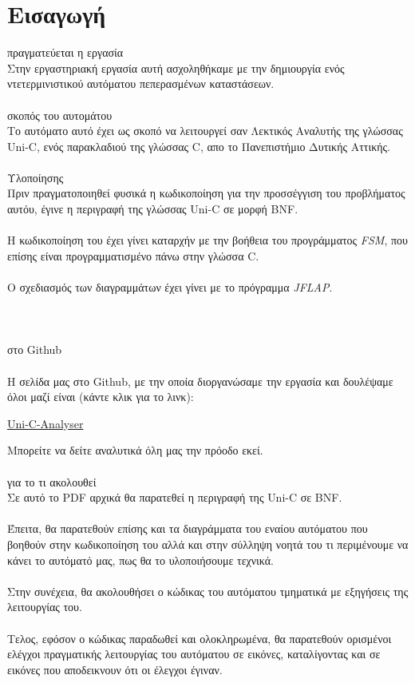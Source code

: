 \documentclass[14pt]{extarticle}
\begin{document}
\section{Εισαγωγή}
\large{ πραγματεύεται η εργασία}
\\
Στην εργαστηριακή εργασία αυτή ασχοληθήκαμε με την δημιουργία ενός ντετερμινιστικού αυτόματου πεπερασμένων καταστάσεων.
\\
\\
\large{ σκοπός του αυτομάτου}
\\
Το αυτόματο αυτό έχει ως σκοπό να λειτουργεί σαν Λεκτικός Αναλυτής της γλώσσας \textlatin{Uni-C}, ενός παρακλαδιού της γλώσσας \textlatin{C}, απο το Πανεπιστήμιο Δυτικής Αττικής.  
\\
\\
\large{ Υλοποίησης}
\\
Πριν πραγματοποιηθεί φυσικά η κωδικοποίηση για την προσσέγγιση του προβλήματος αυτόυ, έγινε η περιγραφή της γλώσσας \textlatin{Uni-C} σε μορφή \textlatin{BNF}. 
\\
\\
Η κωδικοποίηση του έχει γίνει καταρχήν με την βοήθεια του προγράμματος \emph{\textlatin{FSM}}, που επίσης είναι προγραμματισμένο πάνω στην γλώσσα \textlatin{C}.
\\
\\
Ο σχεδιασμός των διαγραμμάτων έχει γίνει με το πρόγραμμα \emph{\textlatin {JFLAP}}.
\\
\\
\\
\\
\large{ στο \textlatin{Github}}
\\
\\
Η σελίδα μας στο \textlatin{Github}, με την οποία διοργανώσαμε την εργασία και δουλέψαμε όλοι μαζί είναι (κάντε κλικ για το λινκ):
\begin{center}
  \textlatin{
  \href{https://github.com/jiud/uni-C-Analyser}{Uni-C-Analyser}
}
\end{center}
Μπορείτε να δείτε αναλυτικά όλη μας την πρόοδο εκεί.
  \\
  \\
\large{ για το τι ακολουθεί}
\\
Σε αυτό το \textlatin{PDF} αρχικά θα παρατεθεί η περιγραφή της \textlatin{Uni-C} σε \textlatin{BNF}.
\\
\\
Έπειτα, θα παρατεθούν επίσης και τα διαγράμματα του εναίου αυτόματου που βοηθούν στην κωδικοποίηση του αλλά και στην σύλληψη νοητά του τι περιμένουμε να κάνει το αυτόματό μας, πως θα το υλοποιήσουμε τεχνικά. 
\\
\\
Στην συνέχεια, θα ακολουθήσει ο κώδικας του αυτόματου τμηματικά με εξηγήσεις της λειτουργίας του.
\\
\\
Τελος, εφόσον ο κώδικας παραδωθεί και ολοκληρωμένα, θα παρατεθούν ορισμένοι ελέγχοι πραγματικής λειτουργίας του αυτόματου σε εικόνες, καταλίγοντας και σε εικόνες που αποδεικνουν ότι οι έλεγχοι έγιναν.
\end{document}
